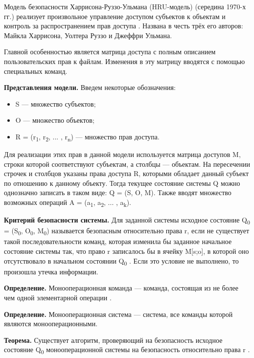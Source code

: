 Модель безопасности Харрисона-Руззо-Ульмана (HRU-модель) (середина 1970-х гг.) реализует произвольное управление
доступом субъектов к объектам и контроль за распространением прав доступа \autocite{Zegzhda}. Названа в честь
трёх его авторов: Майкла Харрисона, Уолтера Руззо и Джеффри Ульмана.

Главной особенностью является матрица доступа с полным описанием пользовательских прав к файлам. Изменения в эту
матрицу вводятся с помощью специальных команд.

\textbf{Представления модели.} Введем некоторые обозначения:
\begin{itemize}
    \item S — множество субъектов;
    \item O — множество объектов;
    \item R = (r\textsubscript{1}, r\textsubscript{2}, ... , r\textsubscript{n}) — множество прав доступа.
\end{itemize}
Для реализации этих прав в данной модели используется матрица доступов M, строки которой соответствуют субъектам,
а столбцы — объектам. На пересечении строчек и столбцов указаны права доступа R, которыми обладает данный субъект
по отношению к данному объекту. Тогда текущее состояние системы Q можно однозначно записать в таком виде:
Q = (S, O, M). Также вводят множество возможных операций A = (a\textsubscript{1}, a\textsubscript{2}, ... , a\textsubscript{k}).

\textbf{Критерий безопасности системы.} Для заданной системы исходное состояние Q\textsubscript{0} = (S\textsubscript{0},
O\textsubscript{0}, M\textsubscript{0}) называется безопасным относительно права r, если не существует такой
последовательности команд, которая изменила бы заданное начальное состояние системы так, что право r записалось бы в
ячейку M[s;o], в которой оно отсутствовало в начальном состоянии Q\textsubscript{0} \autocite{Zegzhda}. Если это условие не выполнено,
то произошла утечка информации.

\textbf{Определение.} Монооперационная команда --- команда, состоящая из не более чем одной элементарной операции \autocite{Zegzhda}.

\textbf{Определение.} Монооперационная система --- система, все команды которой являются монооперационными.

\textbf{Теорема.} Существует алгоритм, проверяющий на безопасность исходное состояние Q\textsubscript{0}
монооперационной системы на безопасность относительно права r \autocite{WikiHRU}.

